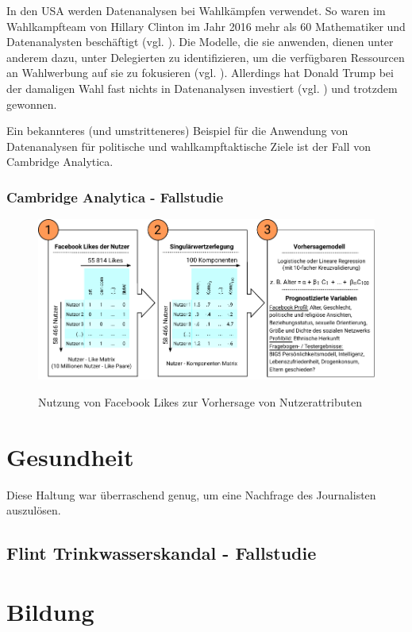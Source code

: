 In den USA werden Datenanalysen bei Wahlkämpfen verwendet. So waren im Wahlkampfteam von
Hillary Clinton im Jahr 2016 mehr als 60 Mathematiker und Datenanalysten beschäftigt (vgl. \cite{Goldmacher}). 
Die Modelle, die sie anwenden, dienen unter anderem dazu, \grqq{} unter Delegierten zu identifizieren,
um die verfügbaren Ressourcen an Wahlwerbung auf sie zu fokusieren (vgl. \cite{Goldmacher}). Allerdings hat Donald Trump bei der damaligen Wahl
fast nichts in Datenanalysen investiert (vgl. \cite{Goldmacher}) und trotzdem gewonnen.

Ein bekannteres (und umstritteneres) Beispiel für die Anwendung von Datenanalysen
für politische und wahlkampftaktische Ziele ist der Fall von Cambridge Analytica.

\subsubsection{Cambridge Analytica - Fallstudie}

\begin{figure}%
\centering
\caption{Nutzung von Facebook Likes zur Vorhersage von Nutzerattributen}
\includegraphics[scale=1.0]{Grafiken/Facebook_Likes_Ink.pdf} 
\label{pic:Like_Matrix}
\end{figure}

\section{Gesundheit}

Diese Haltung war überraschend genug, um eine Nachfrage des Journalisten
auszulösen.

\subsection{Flint Trinkwasserskandal - Fallstudie}

\section{Bildung}

